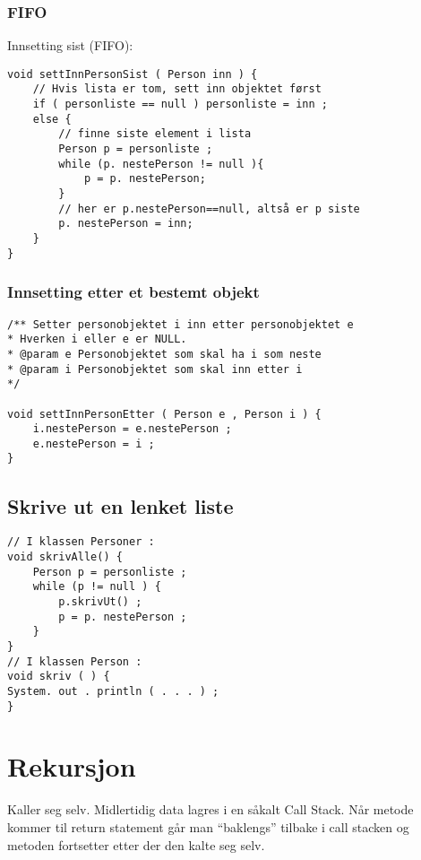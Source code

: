 \documentclass[a4paper,norsk,10pt]{article}
\begin{document}
\subsubsection{FIFO}
\label{sec-8.2.2}

Innsetting sist (FIFO):

\begin{verbatim}
void settInnPersonSist ( Person inn ) {
    // Hvis lista er tom, sett inn objektet først
    if ( personliste == null ) personliste = inn ;
    else {
        // finne siste element i lista
        Person p = personliste ;
        while (p. nestePerson != null ){
            p = p. nestePerson;
        }
        // her er p.nestePerson==null, altså er p siste
        p. nestePerson = inn;
    }
}
\end{verbatim}
\subsubsection{Innsetting etter et bestemt objekt}
\label{sec-8.2.3}


\begin{verbatim}
/** Setter personobjektet i inn etter personobjektet e
* Hverken i eller e er NULL.
* @param e Personobjektet som skal ha i som neste
* @param i Personobjektet som skal inn etter i
*/

void settInnPersonEtter ( Person e , Person i ) {
    i.nestePerson = e.nestePerson ;
    e.nestePerson = i ;
}
\end{verbatim}
\subsection{Skrive ut en lenket liste}
\label{sec-11.1}


\begin{verbatim}
// I klassen Personer :
void skrivAlle() {
    Person p = personliste ;
    while (p != null ) {
        p.skrivUt() ;
        p = p. nestePerson ;
    }
}
// I klassen Person :
void skriv ( ) {
System. out . println ( . . . ) ;
}
\end{verbatim}
\section{Rekursjon}
\label{sec-12}


Kaller seg selv.
Midlertidig data lagres i en såkalt Call Stack. Når metode kommer til
return statement går man ``baklengs'' tilbake i call stacken og metoden
fortsetter etter der den kalte seg selv.
\end{document}
